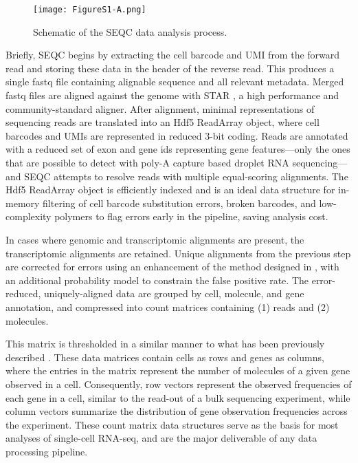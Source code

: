 \begin{figure}
\centering
\texttt{[image: FigureS1-A.png]}
\caption{Schematic of the SEQC data analysis process.}
\label{fig:s1a}
\end{figure} 

Briefly, SEQC begins by extracting the cell barcode and UMI from the forward read and storing these data in the header of the reverse read.
This produces a single fastq file containing alignable sequence and all relevant metadata.
Merged fastq files are aligned against the genome with STAR \citep{Dobin2013}, a high performance and community-standard aligner. 
After alignment, minimal representations of sequencing reads are translated into an Hdf5 {\mono ReadArray} object, where cell barcodes and UMIs are represented in reduced 3-bit coding. 
Reads are annotated with a reduced set of exon and gene ids representing gene features---only the ones that are possible to detect with poly-A capture based droplet RNA sequencing---and SEQC attempts to resolve reads with multiple equal-scoring alignments.
The Hdf5 {\mono ReadArray} object is efficiently indexed and is an ideal data structure for in-memory filtering of cell barcode substitution errors, broken barcodes, and low-complexity polymers to flag errors early in the pipeline, saving analysis cost.

In cases where genomic and transcriptomic alignments are present, the transcriptomic alignments are retained. 
Unique alignments from the previous step are corrected for errors using an enhancement of the method designed in \cite{Jaitin2014}, with an additional probability model to constrain the false positive rate.
The error-reduced, uniquely-aligned data are grouped by cell, molecule, and gene annotation, and compressed into count matrices containing (1) reads and (2) molecules. 

This matrix is thresholded in a similar manner to what has been previously described \citep{Macosko2015,Zheng2017a}. 
These data matrices contain cells as rows and genes as columns, where the entries in the matrix represent the number of molecules of a given gene observed in a cell. 
Consequently, row vectors represent the observed frequencies of each gene in a cell, similar to the read-out of a bulk sequencing experiment, while column vectors summarize the distribution of gene observation frequencies across the experiment. 
These count matrix data structures serve as the basis for most analyses of single-cell RNA-seq, and are the major deliverable of any data processing pipeline. 

